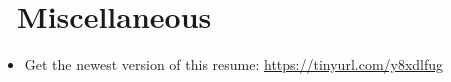 \documentclass{style/resume2}
\begin{document}

\section{\faInfo\ Miscellaneous}
\begin{itemize}[parsep=0.5ex]
  \item Get the newest version of this resume: \url{https://tinyurl.com/y8xdlfug}
\end{itemize}

%
%
\end{document}
